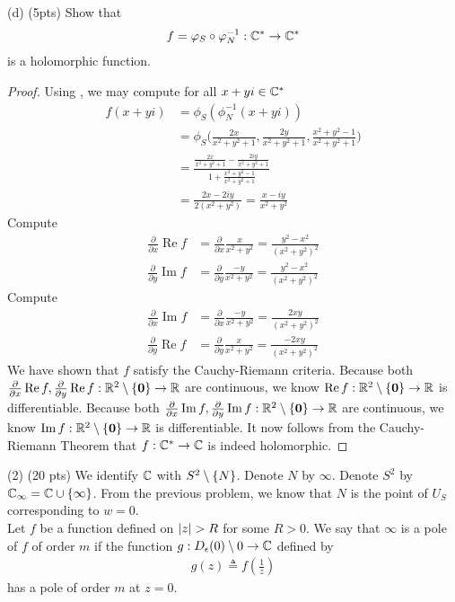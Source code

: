 \documentclass{report}
\begin{document}
\begin{question}{}{}
  (d) (5pts) Show that 
  \begin{align*}
  f= \varphi_S \circ \varphi_N^{-1} :\mathbb{C}^* \rightarrow \mathbb{C}^* 
  \end{align*}
  is a holomorphic function. 
\end{question}
\begin{proof}
Using , we may compute for all $x+yi \in\mathbb{C}^*$ 
\begin{align*}
f(x+yi)&= \phi_S (\phi_N^{-1}(x+yi)) \\
&=\phi_S \Big(\frac{2x}{x^2+y^2+1}, \frac{2y}{x^2+y^2+1}, \frac{x^2+y^2-1}{x^2+y^2+1}\Big)  \\
&= \frac{\frac{2x}{x^2+y^2+1}- \frac{2iy}{x^2+y^2+1}}{1+ \frac{x^2+y^2-1}{x^2+y^2+1}} \\
&= \frac{2x-2iy}{2(x^2+y^2)}= \frac{x-iy}{x^2+y^2}
\end{align*}
Compute 
\begin{align*}
\frac{\partial }{\partial x}\operatorname{Re}f&= \frac{\partial }{\partial x} \frac{x}{x^2+y^2}= \frac{y^2-x^2}{(x^2+y^2)^2} \\
\frac{\partial }{\partial y}\operatorname{Im}f&=\frac{\partial }{\partial y} \frac{-y}{x^2+y^2}= \frac{y^2-x^2}{(x^2+y^2)^2} 
\end{align*}
Compute 
\begin{align*}
\frac{\partial }{\partial x} \operatorname{Im} f&= \frac{\partial }{\partial x} \frac{-y}{x^2+y^2}= \frac{2xy}{(x^2+y^2)^2} \\
\frac{\partial }{\partial y}\operatorname{Re}f &= \frac{\partial }{\partial y} \frac{x}{x^2+y^2}= \frac{-2xy}{(x^2+y^2)^2}
\end{align*}
We have shown that $f$ satisfy the Cauchy-Riemann criteria. Because both $\frac{\partial }{\partial x}\operatorname{Re}f,\frac{\partial }{\partial y}\operatorname{Re}f:\mathbb{R}^2 \setminus \{ \textbf{0} \} \rightarrow \mathbb{R}$ are continuous, we know $\operatorname{Re}f:\mathbb{R}^2\setminus \{ \textbf{0} \} \rightarrow \mathbb{R}$ is differentiable.  Because both $\frac{\partial }{\partial x}\operatorname{Im}f,\frac{\partial }{\partial y}\operatorname{Im}f:\mathbb{R}^2\setminus \{ \textbf{0} \} \rightarrow \mathbb{R}$ are continuous, we know $\operatorname{Im}f:\mathbb{R}^2 \setminus \{ \textbf{0} \} \rightarrow \mathbb{R}$ is differentiable. It now follows from the Cauchy-Riemann Theorem that $f:\mathbb{C}^*\rightarrow \mathbb{C}$ is indeed holomorphic. 
\end{proof}
\begin{mdframed}
  (2) (20 pts) We identify $\mathbb{C}$ with  $S^2 \setminus \{ N \}$. Denote $N$ by $\infty$. Denote $S^2 $ by  $\mathbb{C}_{\infty}= \mathbb{C} \cup  \{ \infty \}$. From the previous problem, we know that  $N$ is the point of  $U_S$ corresponding  to  $w=0$. \\

   Let $f$ be a function defined on $\abso{z}>R$ for some $R>0$. We say that  $\infty$ is a pole of $f$ of order $m$ if the function $g:D_{\epsilon }(0)\setminus 0 \rightarrow \mathbb{C}$ defined by 
   \begin{align*}
   g(z)\triangleq f(\frac{1}{z})
   \end{align*}
  has a pole of order $m$ at  $z=0$. 
\end{mdframed}
\end{document}
